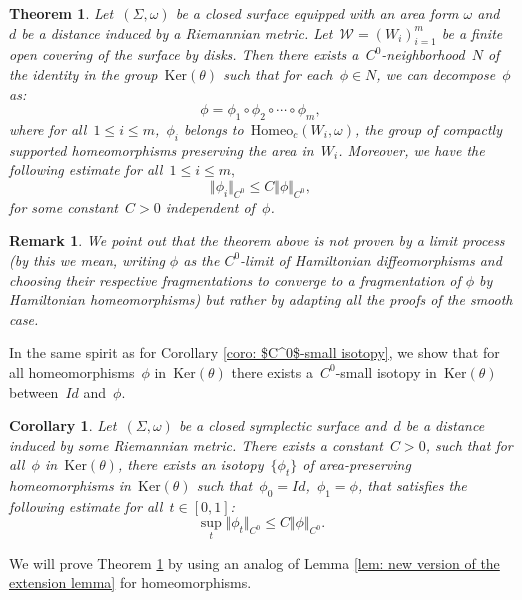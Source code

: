 \documentclass[10pt]{amsart}
\newtheorem{thm}{Theorem}
\newtheorem{rk}[prop]{Remark}
\newtheorem{coro}{Corollary}
\newcommand{\Homeo}{\mathrm{Homeo}}
\newcommand{\Ker}{\mathrm{Ker}}
\begin{document}
\begin{thm}\label{thm: fragmentation lemma for Homeo}
	Let~$(\Sigma,\omega)$ be a closed surface equipped with an area form $\omega$ and~$d$ be a distance induced by a Riemannian metric. Let~$\mathcal{W}=(W_i)_{i=1}^m$ be a finite open covering of the surface by disks. Then there exists a~$C^0$-neighborhood~$N$ of the identity in the group~$\Ker(\theta)$ such that for each~$\phi\in N$, we can decompose~$\phi$ as:
	$$\phi=\phi_1 \circ \phi_2 \circ\cdots \circ \phi_m,$$
	where for all~$1\leq i\leq m$,~$\phi_i$ belongs to~$\Homeo_{c}(W_i,\omega)$, the group of compactly supported homeomorphisms preserving the area in~$W_i$. Moreover, we have the following estimate for all~$1\leq i\leq m,$
	$$\Vert \phi_i \Vert_{C^0}\leq C \Vert \phi \Vert_{C^0},$$
	for some constant~$C>0$ independent of~$\phi$.
\end{thm}

\begin{rk}
We point out that the theorem above is not proven by a limit process (by this we mean, writing $\phi$ as the $C^0$-limit of Hamiltonian diffeomorphisms and choosing their respective fragmentations to converge to a fragmentation of $\phi$ by Hamiltonian homeomorphisms) but rather by adapting all the proofs of the smooth case.
\end{rk}

In the same spirit as for Corollary \ref{coro: $C^0$-small isotopy}, we show that for all homeomorphisms~$\phi$ in~$\Ker(\theta)$ there exists a~$C^0$-small isotopy in~$\Ker(\theta)$ between~$Id$ and~$\phi$.

\begin{coro}\label{coro: $C^0$-small isotopy for homeo}
	Let~$(\Sigma, \omega)$ be a closed symplectic surface and~$d$ be a distance induced by some Riemannian metric. There exists a constant~$C>0$, such that for all~$\phi$ in~$\Ker(\theta)$, there exists an isotopy~$\{\phi_t\}$ of area-preserving homeomorphisms in~$\Ker(\theta)$ such that~$\phi_0=Id$,~$\phi_1=\phi$, that satisfies the following estimate for all~$t \in [0,1]$:
	$$\underset{t}{\sup}\Vert \phi_t \Vert_{C^0}\leq C \Vert \phi \Vert_{C^0}.$$
\end{coro}

We will prove Theorem \ref{thm: fragmentation lemma for Homeo} by using an analog of Lemma \ref{lem: new version of the extension lemma} for homeomorphisms.
\end{document}
